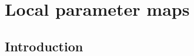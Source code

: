 \section{Local parameter maps}\label{sec:pf:llc}

\providecommand{\llcIrr}{\operatorname{Irr}}
\providecommand{\llcWD}{\mathrm{WD}}
\providecommand{\llcrc}{\mathrm{rc}}
\providecommand{\llcSp}{\operatorname{Sp}}
\providecommand{\llcseg}{\operatorname{seg}}
\providecommand{\llcG}{\mathsf{G}}
\providecommand{\llcred}{\operatorname{red}}
\providecommand{\llcPar}{\operatorname{Par}}
\providecommand{\llcTy}{\operatorname{Ty}}
\providecommand{\llcCT}{\operatorname{CT}}
\providecommand{\llcGo}{\ensuremath{(\mathrm{G}^\circ)}}
\providecommand{\llcm}{\mathfrak m}
\providecommand{\llcp}{\mathfrak p}
\providecommand{\llcK}{\mathrm{K}_1}

\subsection{Introduction}\label{pf:llc:intro}

